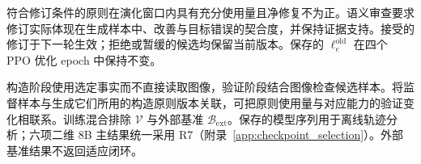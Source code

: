 符合修订条件的原则在演化窗口内具有充分使用量且净修复不为正。语义审查要求修订实际体现在生成样本中、改善与目标错误的契合度，并保持证据支持。接受的修订于下一轮生效；拒绝或暂缓的候选均保留当前版本。保存的 $\ell_e^{\mathrm{old}}$ 在四个 PPO 优化 epoch 中保持不变。

构造阶段使用选定事实而不直接读取图像，验证阶段结合图像检查候选样本。将监督样本与生成它们所用的构造原则版本关联，可把原则使用量与对应能力的验证变化相联系。训练混合排除 $\mathcal V$ 与外部基准 $\mathcal B_{\mathrm{ext}}$。保存的模型序列用于离线轨迹分析；六项二维 8B 主结果统一采用 R7（附录~\ref{app:checkpoint_selection}）。外部基准结果不返回适应闭环。
